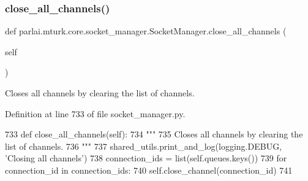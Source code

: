 \mbox{\label{classparlai_1_1mturk_1_1core_1_1socket__manager_1_1SocketManager_a9a2c04d9512e6866dfda33397d8f363c}} 
\subsubsection{\texorpdfstring{close\+\_\+all\+\_\+channels()}{close\_all\_channels()}}
{\footnotesize\ttfamily def parlai.\+mturk.\+core.\+socket\+\_\+manager.\+Socket\+Manager.\+close\+\_\+all\+\_\+channels (\begin{DoxyParamCaption}\item[{}]{self }\end{DoxyParamCaption})}

\begin{DoxyVerb}Closes all channels by clearing the list of channels.
\end{DoxyVerb}
 

Definition at line 733 of file socket\+\_\+manager.\+py.


\begin{DoxyCode}
733     \textcolor{keyword}{def }close\_all\_channels(self):
734         \textcolor{stringliteral}{"""}
735 \textcolor{stringliteral}{        Closes all channels by clearing the list of channels.}
736 \textcolor{stringliteral}{        """}
737         shared\_utils.print\_and\_log(logging.DEBUG, \textcolor{stringliteral}{'Closing all channels'})
738         connection\_ids = list(self.queues.keys())
739         \textcolor{keywordflow}{for} connection\_id \textcolor{keywordflow}{in} connection\_ids:
740             self.close\_channel(connection\_id)
741 
\end{DoxyCode}
\mbox{\label{classparlai_1_1mturk_1_1core_1_1socket__manager_1_1SocketManager_ae079bc95ebedcab4e52325253db490cf}} 
